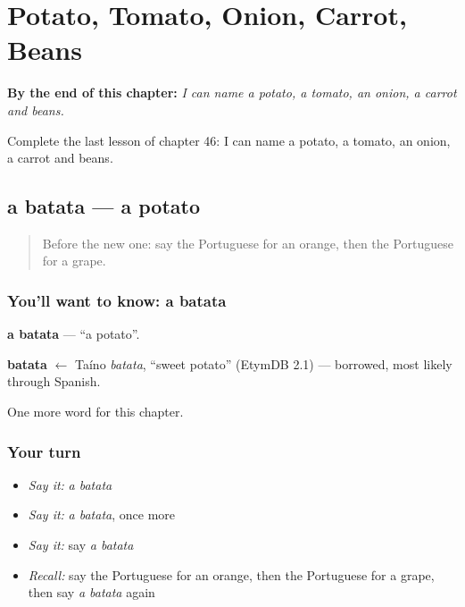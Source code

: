 
\chapter{Potato, Tomato, Onion, Carrot, Beans}
\label{ch:pt-potato-tomato-onion-carrot-beans}

\begin{chapteropening}
\textbf{By the end of this chapter:} \emph{I can name a potato, a tomato, an onion, a carrot and beans.}

Complete the last lesson of chapter 46: I can name a potato, a tomato, an onion, a carrot and beans.
\end{chapteropening}

\section[a batata]{a batata — a potato}

\label{lesson:PT-C46-batata}



\begin{quote}
Before the new one: say the Portuguese for an orange, then the Portuguese for a grape.
\end{quote}

\subsection*{You'll want to know: a batata}
\textbf{a batata} — \textquotedblleft{}a potato\textquotedblright{}.

\begin{cousinweb}
\textbf{batata} $\leftarrow$ Taíno \emph{batata}, \textquotedblleft{}sweet potato\textquotedblright{} (EtymDB 2.1) — borrowed, most likely through Spanish.
\end{cousinweb}

\begin{grammarlens}[title={What you've built}]
One more word for this chapter.
\end{grammarlens}

\subsection*{Your turn}
\begin{itemize}
\raggedright
  \item \emph{Say it:} \emph{a batata}
  \item \emph{Say it:} \emph{a batata}, once more
  \item \emph{Say it:} say \emph{a batata}
  \item \emph{Recall:} say the Portuguese for an orange, then the Portuguese for a grape, then say \emph{a batata} again
\end{itemize}

